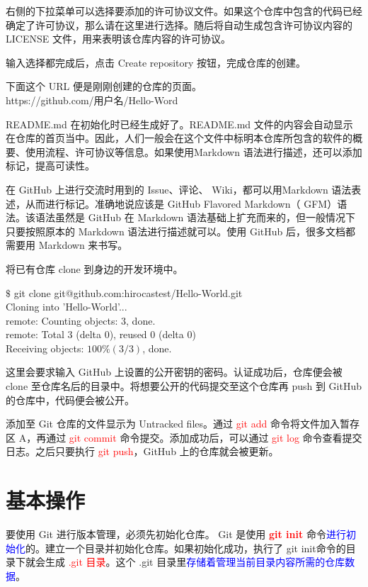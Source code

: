 \documentclass[12pt,a4paper]{article}
\begin{document}
右侧的下拉菜单可以选择要添加的许可协议文件。如果这个仓库中包含的代码已经确定了许可协议，那么请在这里进行选择。随后将自动生成包含许可协议内容的 LICENSE 文件，用来表明该仓库内容的许可协议。

输入选择都完成后，点击 Create repository 按钮，完成仓库的创建。

下面这个 URL 便是刚刚创建的仓库的页面。\\
https://github.com/用户名/Hello-Word

README.md 在初始化时已经生成好了。README.md 文件的内容会自动显示在仓库的首页当中。因此，人们一般会在这个文件中标明本仓库所包含的软件的概要、使用流程、许可协议等信息。如果使用Markdown 语法进行描述，还可以添加标记，提高可读性。

在 GitHub 上进行交流时用到的 Issue、评论、 Wiki，都可以用Markdown 语法表述，从而进行标记。准确地说应该是 GitHub Flavored Markdown（ GFM）语法。该语法虽然是 GitHub 在 Markdown 语法基础上扩充而来的，但一般情况下只要按照原本的 Markdown 语法进行描述就可以。使用 GitHub 后，很多文档都需要用 Markdown 来书写。

将已有仓库 clone 到身边的开发环境中。

$\$$ git clone git@github.com:hirocastest/Hello-World.git \\
Cloning into 'Hello-World'... \\
remote: Counting objects: 3, done. \\
remote: Total 3 (delta 0), reused 0 (delta 0) \\
Receiving objects: $100\% (3/3)$, done.

这里会要求输入 GitHub 上设置的公开密钥的密码。认证成功后，仓库便会被 clone 至仓库名后的目录中。将想要公开的代码提交至这个仓库再 push 到 GitHub 的仓库中，代码便会被公开。

添加至 Git 仓库的文件显示为 Untracked files。通过 \textcolor{red}{git add} 命令将文件加入暂存区 A，再通过 \textcolor{red}{git commit} 命令提交。添加成功后，可以通过 \textcolor{red}{git log} 命令查看提交日志。之后只要执行 \textcolor{red}{git push}，GitHub 上的仓库就会被更新。



\section{基本操作}
要使用 Git 进行版本管理，必须先初始化仓库。 Git 是使用 \textcolor{red}{\bf git init} 命令\textcolor{blue}{进行初始化}的。建立一个目录并初始化仓库。如果初始化成功，执行了 git init命令的目录下就会生成 \textcolor{red}{.git 目录}。这个 .git 目录里\textcolor{blue}{存储着管理当前目录内容所需的仓库数据}。
\end{document}
